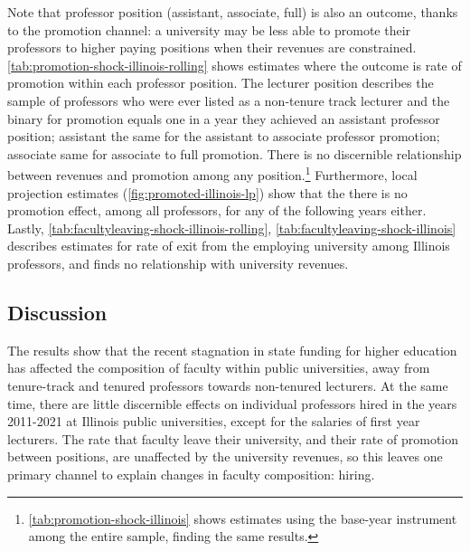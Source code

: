 \documentclass[notitlepage,12pt]{article}
\begin{document}
Note that professor position (assistant, associate, full) is also an outcome, thanks to the promotion channel: a university may be less able to promote their professors to higher paying positions when their revenues are constrained.
\autoref{tab:promotion-shock-illinois-rolling} shows estimates where the outcome is rate of promotion within each professor position.
The lecturer position describes the sample of professors who were ever listed as a non-tenure track lecturer and the binary for promotion equals one in a year they achieved an assistant professor position; assistant the same for the assistant to associate professor promotion; associate same for associate to full promotion.
There is no discernible relationship between revenues and promotion among any position.\footnote{
    \autoref{tab:promotion-shock-illinois} shows estimates using the base-year instrument among the entire sample, finding the same results.
}
Furthermore, local projection estimates (\autoref{fig:promoted-illinois-lp}) show that the there is no promotion effect, among all professors, for any of the following years either.
Lastly, \autoref{tab:facultyleaving-shock-illinois-rolling}, \ref{tab:facultyleaving-shock-illinois} describes estimates for rate of exit from the employing university among Illinois professors, and finds no relationship with university revenues.

\subsection{Discussion}

The results show that the recent stagnation in state funding for higher education has affected the composition of faculty within public universities, away from tenure-track and tenured professors towards non-tenured lecturers.
At the same time, there are little discernible effects on individual professors hired in the years 2011-2021 at Illinois public universities, except for the salaries of first year lecturers.
The rate that faculty leave their university, and their rate of promotion between positions, are unaffected by the university revenues, so this leaves one primary channel to explain changes in faculty composition: hiring.
\end{document}
